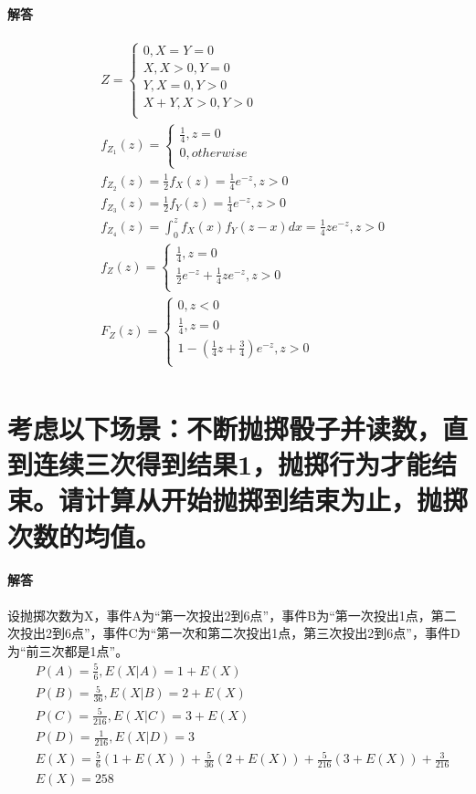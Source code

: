 \documentclass[UTF8]{ctexart}
\begin{document}
\paragraph{解答}
\begin{equation*}
\begin{aligned}
&Z=\begin{cases}
0,X=Y=0\\
X,X>0,Y=0\\
Y,X=0,Y>0\\
X+Y,X>0,Y>0\\
\end{cases}
\\
&f_{Z_1}(z)=\begin{cases}
\frac{1}{4},z=0\\
0, otherwise\\
\end{cases}
\\
&f_{Z_2}(z)=\frac{1}{2}f_X(z)=\frac{1}{4}e^{-z},z>0\\
&f_{Z_3}(z)=\frac{1}{2}f_Y(z)=\frac{1}{4}e^{-z},z>0\\
&f_{Z_4}(z)=\int_0^zf_X(x)f_Y(z-x)dx=\frac{1}{4}ze^{-z},z>0\\
&f_Z(z)=\begin{cases}
\frac{1}{4},z=0\\
\frac{1}{2}e^{-z}+\frac{1}{4}ze^{-z},z>0\\
\end{cases}
\\
&F_Z(z)=\begin{cases}
0,z<0\\
\frac{1}{4},z=0\\
1-(\frac{1}{4}z+\frac{3}{4})e^{-z},z>0\\
\end{cases}
\\
\end{aligned}
\end{equation*}
\section{考虑以下场景：不断抛掷骰子并读数，直到连续三次得到结果1，抛掷行为才能结束。请计算从开始抛掷到结束为止，抛掷次数的均值。}
\paragraph{解答}
设抛掷次数为X，事件A为“第一次投出2到6点”，事件B为“第一次投出1点，第二次投出2到6点”，事件C为“第一次和第二次投出1点，第三次投出2到6点”，事件D为“前三次都是1点”。
\begin{equation*}
\begin{aligned}
&P(A)=\frac{5}{6},E(X\lvert A)=1+E(X)\\
&P(B)=\frac{5}{36},E(X\lvert B)=2+E(X)\\
&P(C)=\frac{5}{216},E(X\lvert C)=3+E(X)\\
&P(D)=\frac{1}{216},E(X\lvert D)=3\\
&E(X)=\frac{5}{6}(1+E(X))+\frac{5}{36}(2+E(X))+\frac{5}{216}(3+E(X))+\frac{3}{216}\\
&E(X)=258\\
\end{aligned}
\end{equation*}
\end{document}

